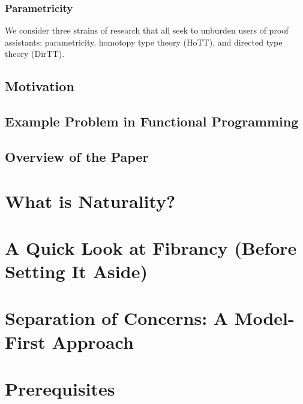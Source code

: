 \documentclass{lmcs} %
\theoremstyle{plain}\newtheorem{satz}[thm]{Satz} %
\theoremstyle{plain}
\theoremstyle{definition}
\begin{document}
\subsubsection{Parametricity}\label{sec:intro:param}


We consider three strains of research that all seek to unburden users of proof assistants: parametricity, homotopy type theory (HoTT), and directed type theory (DirTT).




\subsection{Motivation}

\subsection{Example Problem in Functional Programming}

\subsection{Overview of the Paper}

\section{What is Naturality?}

\section{A Quick Look at Fibrancy (Before Setting It Aside)}

\section{Separation of Concerns: A Model-First Approach}

\section{Prerequisites}
\end{document}
